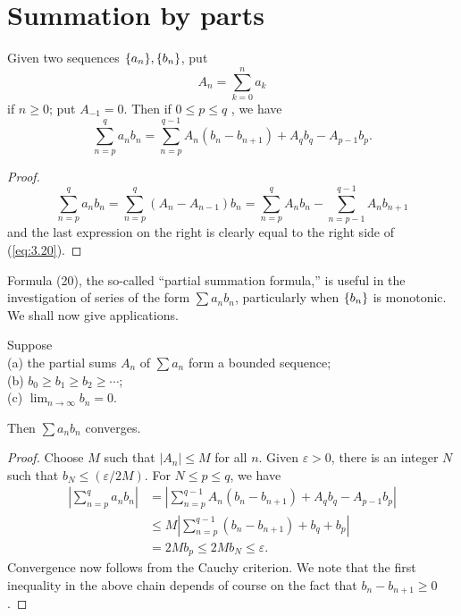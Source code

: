 \section{Summation by parts}
\begin{thm}
    \label{thm:3.41}
    Given two sequences $\protect\{a_n\}, \protect\{b_n\}$, put
    \begin{equation*}
        A_n = \sum_{k=0}^{n} a_k
    \end{equation*}
    if $n \geq 0$; put $A_{-1} = 0$. Then if $0\leq p\leq q$ , we have
    \begin{equation}
        \label{eq:3.20}
        \sum_{n=p}^{q} a_n b_n
        = \sum_{n=p}^{q-1} A_n (b_n - b_{n+1}) + A_q b_q - A_{p-1} b_p.
    \end{equation}
\end{thm}

\begin{proof}
    \begin{equation*}
        \sum_{n=p}^{q} a_n b_n
        = \sum_{n=p}^{q} (A_n - A_{n-1}) b_n
        = \sum_{n=p}^{q} A_n b_n - \sum_{n=p-1}^{q-1} A_n b_{n+1}        
    \end{equation*}
    and the last expression on the right is clearly equal to the right side of (\ref{eq:3.20}).
\end{proof}

Formula (20), the so-called ``partial summation formula,''
is useful in the investigation of series of the form $\sum a_n b_n$,
particularly when $\protect\{b_n\}$ is monotonic.
We shall now give applications.

\begin{thm} 
    \label{thm:3.42}
    Suppose\\
    (a) the partial sums $A_n$ of $\sum a_n$ form a bounded sequence;\\
    (b) $b_0 \geq b_1 \geq b_2 \geq \cdots$;\\
    (c) $\lim_{n \to \infty} b_n = 0$.

Then $\sum a_n b_n$ converges.
\end{thm}

\begin{proof}
    Choose $M$ such that $|A_n| \leq M$ for all $n$.
    Given $\varepsilon > 0$, there is an integer $N$ such that $b_N \leq (\varepsilon/2M)$. For $N \leq p \leq q$, we have
    \begin{align*}
        \left|\sum_{n=p}^{q} a_n b_n\right|
        &= \left| \sum_{n=p}^{q-1} A_n (b_n - b_{n+1}) + A_q b_q - A_{p-1} b_p \right|\\
        &\leq M \left| \sum_{n=p}^{q-1} (b_n - b_{n+1}) + b_q + b_p \right|\\
        &= 2 M b_p \leq 2 M b_N \leq \varepsilon.
    \end{align*}
    Convergence now follows from the Cauchy criterion.
    We note that the first inequality in the above chain depends of course on the fact that $b_n - b_{n+1} \geq 0$.
\end{proof}

